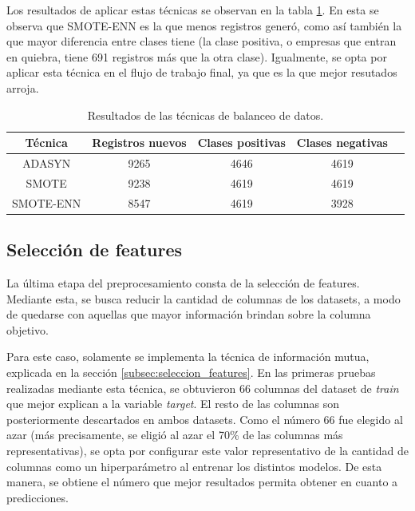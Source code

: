 Los resultados de aplicar estas técnicas se observan en la tabla \ref{tab:resultados-balanceo}. En esta se observa que SMOTE-ENN es la que menos registros generó, como así también la que mayor diferencia entre clases tiene (la clase positiva, o empresas que entran en quiebra, tiene 691 registros más que la otra clase). Igualmente, se opta por aplicar esta técnica en el flujo de trabajo final, ya que es la que mejor resutados arroja.

\begin{table}[H]
	\centering
	\caption[Técnicas utilizadas]{Resultados de las técnicas de balanceo de datos.}
	\begin{tabular}{c c c c c}
		\toprule
		\textbf{Técnica} 	 & \textbf{Registros nuevos} & \textbf{Clases positivas} & \textbf{Clases negativas}\\
		\midrule
        ADASYN & 9265 & 4646 & 4619 \\
        SMOTE & 9238 & 4619 & 4619  \\
        SMOTE-ENN & 8547 & 4619 & 3928 \\		
		\bottomrule
		\hline
	\end{tabular}
	\label{tab:resultados-balanceo}
\end{table}

\subsection{Selección de features}
\label{subsec:preproc_seleccion_features}

La última etapa del preprocesamiento consta de la selección de features. Mediante esta, se busca reducir la cantidad de columnas de los datasets, a modo de quedarse con aquellas que mayor información brindan sobre la columna objetivo.

Para este caso, solamente se implementa la técnica de información mutua, explicada en la sección \ref{subsec:seleccion_features}. En las primeras pruebas realizadas mediante esta técnica, se obtuvieron 66 columnas del dataset de \textit{train} que mejor explican a la variable \textit{target}. El resto de las columnas son posteriormente descartados en ambos datasets. Como el número 66 fue elegido al azar (más precisamente, se eligió al azar el 70\% de las columnas más representativas), se opta por configurar este valor representativo de la cantidad de columnas como un hiperparámetro al entrenar los distintos modelos. De esta manera, se obtiene el número que mejor resultados permita obtener en cuanto a predicciones.

